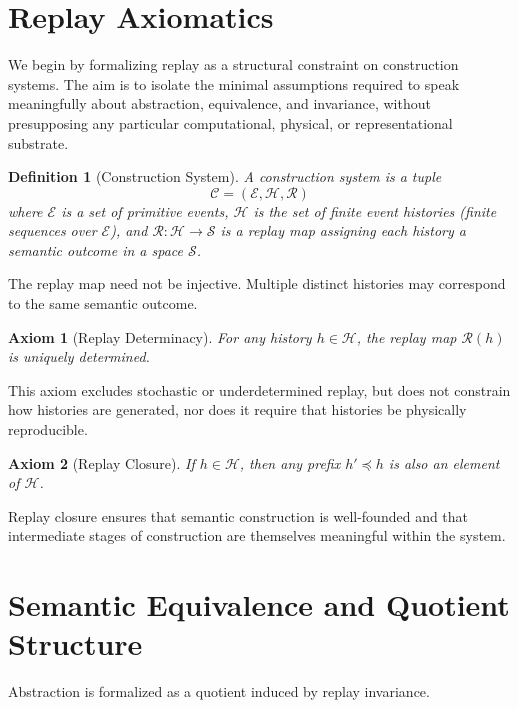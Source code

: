 \documentclass[11pt]{article}
\newtheorem{definition}{Definition}[section]
\newtheorem{axiom}{Axiom}[section]
\begin{document}
\appendix

\section{Replay Axiomatics}

We begin by formalizing replay as a structural constraint on construction systems. The aim is to isolate the minimal assumptions required to speak meaningfully about abstraction, equivalence, and invariance, without presupposing any particular computational, physical, or representational substrate.

\begin{definition}[Construction System]
A construction system is a tuple
\[
\mathcal{C} = (\mathcal{E}, \mathcal{H}, \mathcal{R})
\]
where $\mathcal{E}$ is a set of primitive events, $\mathcal{H}$ is the set of finite event histories (finite sequences over $\mathcal{E}$), and $\mathcal{R} : \mathcal{H} \to \mathcal{S}$ is a replay map assigning each history a semantic outcome in a space $\mathcal{S}$.
\end{definition}

The replay map need not be injective. Multiple distinct histories may correspond to the same semantic outcome.

\begin{axiom}[Replay Determinacy]
For any history $h \in \mathcal{H}$, the replay map $\mathcal{R}(h)$ is uniquely determined.
\end{axiom}

This axiom excludes stochastic or underdetermined replay, but does not constrain how histories are generated, nor does it require that histories be physically reproducible.

\begin{axiom}[Replay Closure]
If $h \in \mathcal{H}$, then any prefix $h' \preceq h$ is also an element of $\mathcal{H}$.
\end{axiom}

Replay closure ensures that semantic construction is well-founded and that intermediate stages of construction are themselves meaningful within the system.

\section{Semantic Equivalence and Quotient Structure}

Abstraction is formalized as a quotient induced by replay invariance.
\end{document}
